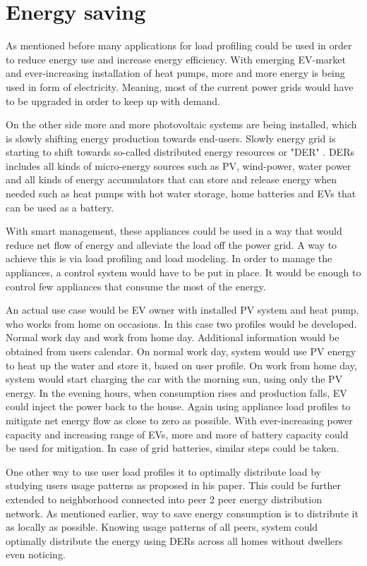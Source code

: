 \documentclass[
11pt, %
english, %
singlespacing, %
headsepline, %
]{MastersDoctoralThesis} %
\begin{document}
\section{Energy saving}

As mentioned before many applications for load profiling could be used in order to reduce energy use and increase energy efficiency. 
With emerging EV-market and ever-increasing installation of heat pumps, more and more energy is being used in form of electricity. 
Meaning, most of the current power grids would have to be upgraded in order to keep up with demand.

On the other side more and more photovoltaic systems are being installed, which is slowly shifting energy production towards end-users.
Slowly energy grid is starting to shift towards so-called distributed energy resources or "DER" \cite{MORENOJARAMILLO2021445}.
DERs includes all kinds of micro-energy sources such as PV, wind-power, water power and all kinds of energy accumulators that can store 
and release energy when needed such as heat pumps with hot water storage, home batteries and EVs that can be used as a battery.

With smart management, these appliances could be used in a way that would reduce net flow of energy and alleviate the load off the power grid.
A way to achieve this is via load profiling and load modeling. 
In order to manage the appliances, a control system would have to be put in place. 
It would be enough to control few appliances that consume the most of the energy. 

An actual use case would be EV owner with installed PV system and heat pump, who works from home on occasions. 
In this case two profiles would be developed. Normal work day and work from home day.
Additional information would be obtained from users calendar. 
On normal work day, system would use PV energy to heat up the water and store it, based on user profile.
On work from home day, system would start charging the car with the morning sun, using only the PV energy. 
In the evening hours, when consumption rises and production falls, EV could inject the power back to the house.
Again using appliance load profiles to mitigate net energy flow as close to zero as possible. 
With ever-increasing power capacity and increasing range of EVs, more and more of battery capacity could be used for mitigation. 
In case of grid batteries, similar steps could be taken.

One other way to use user load profiles it to optimally distribute load by studying users usage patterns as \cite{Chuan2014} proposed in his paper. 
This could be further extended to neighborhood connected into peer 2 peer energy distribution network.
As mentioned earlier, way to save energy consumption is to distribute it as locally as possible. 
Knowing usage patterns of all peers, system could optimally distribute the energy using DERs across all homes without dwellers even noticing.
\end{document}

